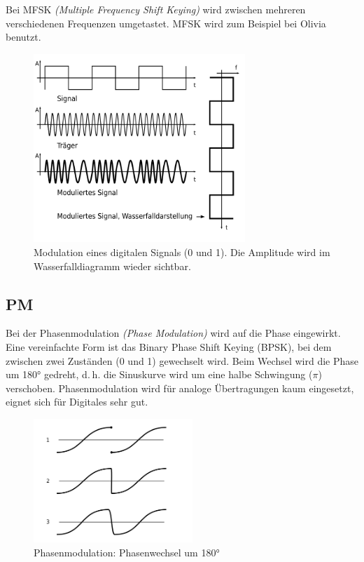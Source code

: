 Bei MFSK \textit{(Multiple Frequency Shift Keying)} wird zwischen mehreren verschiedenen Frequenzen umgetastet. MFSK wird zum Beispiel bei Olivia benutzt.

\begin{figure}[h!]
 \centering
 \includegraphics[width=8cm]{./png/Amfu-FSK.png}
 \caption{Modulation eines digitalen Signals (0 und 1). Die Amplitude wird im Wasserfalldiagramm wieder sichtbar.}
 \label{fig:fskMod}
\end{figure}


\subsection{PM}\label{sec:pm}
Bei der Phasenmodulation \textit{(Phase Modulation)} wird auf die Phase eingewirkt. Eine vereinfachte Form ist das Binary Phase Shift Keying (BPSK), bei dem zwischen zwei Zuständen (0 und 1) gewechselt wird. Beim Wechsel wird die Phase um 180° gedreht, d. h. die Sinuskurve wird um eine halbe Schwingung ($\pi$) verschoben. Phasenmodulation wird für analoge Übertragungen kaum eingesetzt, eignet sich für Digitales sehr gut.

\begin{figure}[h!]
 \centering
 \includegraphics[width=6cm]{./png/Amfu-PM.png}
 \caption{Phasenmodulation: Phasenwechsel um 180°}
 \label{fig:pm}
\end{figure}

